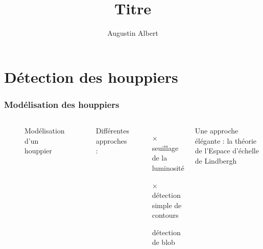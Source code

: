 \documentclass{beamer}
\title{Titre}
\author{Augustin Albert}
\begin{document}
\begin{frame}
	\titlepage
\end{frame}
\begin{frame}
	\tableofcontents
\end{frame}

\section{Détection des houppiers}

\begin{frame}
	\frametitle{Modélisation des houppiers}
	\begin{columns}

	\centering

	\begin{figure}
	\caption{Modélisation d'un houppier}
	\end{figure}

	Différentes approches : 
	\begin{itemize}
		\item[$\times$] seuillage de la luminosité
		\item[$\times$] détection simple de contours
		\item[\checkmark] détection de blob
	\end{itemize}

		\centering
		Une approche élégante : la théorie de l'Espace d'échelle de Lindbergh


\end{columns}
\end{frame}
\end{document}
